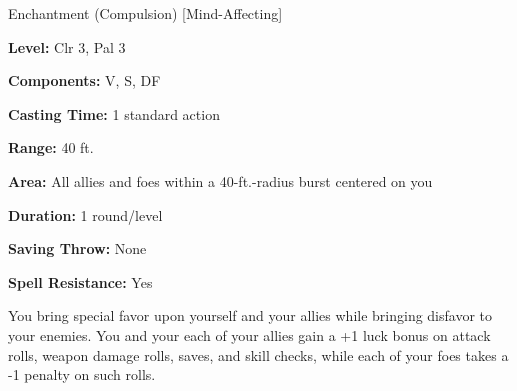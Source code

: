 
Enchantment (Compulsion) [Mind-Affecting]

\textbf{Level:} Clr 3, Pal 3

\textbf{Components:} V, S, DF

\textbf{Casting Time:} 1 standard action

\textbf{Range:} 40 ft.

\textbf{Area:} All allies and foes within a 40-ft.-radius burst centered on you

\textbf{Duration:} 1 round/level

\textbf{Saving Throw:} None

\textbf{Spell Resistance:} Yes

You bring special favor upon yourself and your allies while bringing disfavor to 
your enemies. You and your each of your allies gain a +1 luck bonus on attack rolls, 
weapon damage rolls, saves, and skill checks, while each of your foes takes a -1 
penalty on such rolls.

